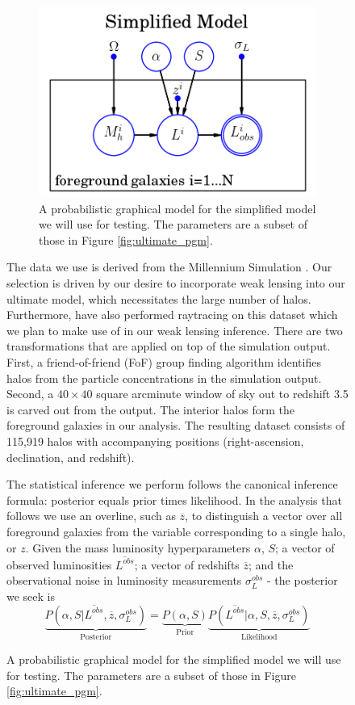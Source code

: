 \documentclass[\docopts]{\docclass}
\begin{document}
\begin{figure}[h!]
\begin{figure}[h]
\centering
\includegraphics[width=0.9\columnwidth]{try2.png}
\caption{
A probabilistic graphical model for the simplified model we will use for testing.
The parameters are a subset of those in Figure \ref{fig:ultimate_pgm}.
\label{fig:simplified_pgm}}
\end{figure}

The data we use is derived from the Millennium Simulation \citep{millennium}. 
Our selection is driven by our desire to incorporate weak lensing into our ultimate model, which necessitates the large number of halos. 
Furthermore, \citet{raytracing} have also performed raytracing on this dataset which we plan to make use of in our weak lensing inference. 
There are two transformations that are applied on top of the simulation output.
First, a friend-of-friend (FoF) group finding algorithm identifies halos from the particle concentrations in the simulation output. Second, a $40 \times 40$ square arcminute window of sky out to redshift 3.5 is carved out from the output. 
The interior halos form the foreground galaxies in our analysis.  
The resulting dataset consists of 115,919 halos with accompanying positions (right-ascension, declination, and redshift).

The statistical inference we perform follows the canonical inference formula: posterior equals prior times likelihood. 
In the analysis that follows we use an overline, such as $\overline{z}$, to distinguish a vector over all foreground galaxies from the variable corresponding to a single halo, or $z$.
Given the mass luminosity hyperparameters $\alpha$, $S$; a vector of observed luminosities $\overline{L^{obs}}$; a vector of redshifts $\overline{z}$; and the observational noise in luminosity measurements $\sigma_L^{obs}$ - the posterior we seek is
$$\underbrace{P(\alpha, S| \overline{L^{obs}}, \overline{z}, \sigma_L^{obs})}_{
	\text{Posterior}} = 
\underbrace{P(\alpha, S)}_{\text{Prior}} \underbrace{P(\overline{L^{obs}}| \alpha, S, \overline{z}, \sigma_L^{obs})}_{\text{Likelihood}}$$


\end{figure}
\end{document}

